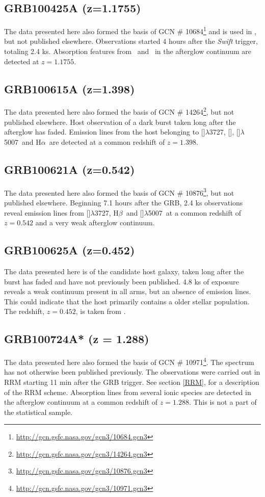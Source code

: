 \documentclass[iop, twocolappendix, numberedappendix, tighten, appendixfloats]{emulateapj}
\newcommand{\hb}{H$\beta$}
\newcommand{\ha}{H$\alpha$}
\newcommand{\oii}{[\ion{O}{2}]$\lambda$3727}
\newcommand{\oiii}{[\ion{O}{3}]$\lambda$5007}
\newcommand{\neiii}{[\ion{Ne}{3}]}
\newcommand{\feii}{\ion{Fe}{2}}
\newcommand{\mgii}{\ion{Mg}{2}}
\begin{document}
	\subsection{GRB100425A (z=1.1755)}
	The data presented here also formed the basis of GCN \#
	10684\footnote{\url{http://gcn.gsfc.nasa.gov/gcn3/10684.gcn3}} and is used in
	\citet{Skuladottir2010}, but not published elsewhere. Observations started 4
	hours after the \textit{Swift} trigger, totaling 2.4 ks. Absorption features
	from \mgii~and \feii~in the afterglow continuum are detected at $z=1.1755$.

	\subsection{GRB100615A (z=1.398)}
	The data presented here also formed the basis of GCN \#
	14264\footnote{\url{http://gcn.gsfc.nasa.gov/gcn3/14264.gcn3}}, but not
	published elsewhere. Host observation of a dark burst\citep{DElia2011} taken
	long after the afterglow has faded. Emission lines from the host belonging to
	\oii, \neiii, \oiii~and \ha~are detected at a common redshift of $z=1.398$.
	
	\subsection{GRB100621A (z=0.542)}
	The data presented here also formed the basis of GCN \#
	10876\footnote{\url{http://gcn.gsfc.nasa.gov/gcn3/10876.gcn3}}, but not
	published elsewhere. Beginning 7.1 hours after the GRB, 2.4 ks observations
	reveal emission lines from \oii, \hb~and \oiii~at a common redshift of
	$z=0.542$ and a very weak afterglow continuum.

	\subsection{GRB100625A (z=0.452)}
	The data presented here is of the candidate host galaxy, taken long after the
	burst has faded and have not previously been published. 4.8 ks of exposure
	reveals a weak continuum present in all arms, but an absence of emission lines.
	This could indicate that the host primarily contains a older stellar
	population. The redshift, $z=0.452$, is taken from \citet{Fong2013}.

	
	\subsection{GRB100724A* (z = 1.288)}
	The data presented here also formed the basis of GCN \#
	10971\footnote{\url{http://gcn.gsfc.nasa.gov/gcn3/10971.gcn3}}. The spectrum
	has not otherwise been published previously. The observations were carried out
	in RRM starting 11 min after the GRB trigger. See section \ref{RRM}, for a
	description of the RRM scheme. Absorption lines from several ionic species are
	detected in the afterglow continuum at a common redshift of $z = 1.288$. This
	is not a part of the statistical sample.
\end{document}
